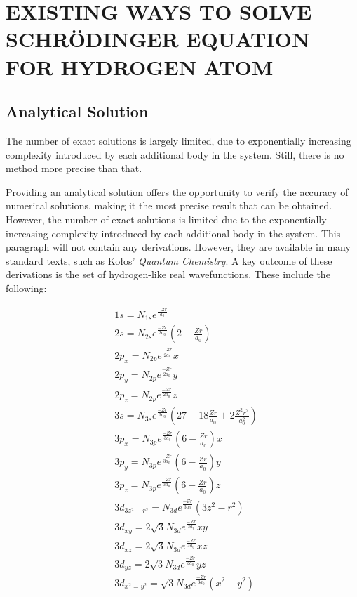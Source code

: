 \section{EXISTING WAYS TO SOLVE SCHRÖDINGER EQUATION FOR HYDROGEN ATOM}

\subsection{Analytical Solution}

The number of exact solutions is largely limited, due to exponentially increasing complexity introduced by each additional body in the system. 
Still, there is no method more precise than that.

Providing an analytical solution offers the opportunity to verify the accuracy of numerical solutions, making it the most precise result that can be obtained. However, the number of exact solutions is limited due to the exponentially increasing complexity introduced by each additional body in the system. This paragraph will not contain any derivations. However, they are available in many standard texts, such as Kołos' \textit{Quantum Chemistry}.
A key outcome of these derivations is the set of hydrogen-like real wavefunctions\cite{kolos1978}. These include the following:

\begin{equation}
	\begin{aligned}
		& 1s = N_{1s}e^{\frac{-Zr}{a_0}} \\
		& 2s = N_{2s}e^{\frac{-Zr}{2a_0}}(2 - \frac{Zr}{a_0}) \\
		& 2p_x =  N_{2p}e^{\frac{-Zr}{2a_0}}x \\
		& 2p_y =  N_{2p}e^{\frac{-Zr}{2a_0}}y \\
		& 2p_z =  N_{2p}e^{\frac{-Zr}{2a_0}}z \\		
		& 3s = N_{3s}e^{\frac{-Zr}{3a_0}}(27 - 18\frac{Zr}{a_0} + 2\frac{Z^2r^2}{a^2_0}) \\
		& 3p_x =  N_{3p}e^{\frac{-Zr}{3a_0}}(6-\frac{Zr}{a_0})x \\
		& 3p_y =  N_{3p}e^{\frac{-Zr}{3a_0}}(6-\frac{Zr}{a_0})y \\
		& 3p_z =  N_{3p}e^{\frac{-Zr}{3a_0}}(6-\frac{Zr}{a_0})z \\
		& 3d_{3z^2-r^2} =  N_{3d}e^{\frac{-Zr}{3a_0}}(3z^2-r^2) \\
		& 3d_{xy} =  2\sqrt{3}N_{3d}e^{\frac{-Zr}{3a_0}}xy \\
		& 3d_{xz} =  2\sqrt{3}N_{3d}e^{\frac{-Zr}{3a_0}}xz \\
		& 3d_{yz} =  2\sqrt{3}N_{3d}e^{\frac{-Zr}{3a_0}}yz \\
		& 3d_{x^2=y^2} =  \sqrt{3}N_{3d}e^{\frac{-Zr}{3a_0}}(x^2-y^2) \\
	\end{aligned}
\end{equation}

